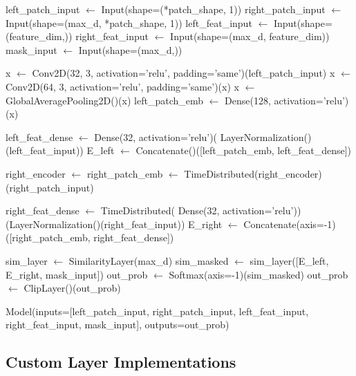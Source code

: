 \documentclass[12pt]{article}
\begin{document}
\begin{algorithm}[H]
\caption{Stereo Matching Model Construction}
\begin{algorithmic}[1]
\State {}
\State left\_patch\_input $\gets$ Input(shape=(*patch\_shape, 1))
\State right\_patch\_input $\gets$ Input(shape=(max\_d, *patch\_shape, 1))
\State left\_feat\_input $\gets$ Input(shape=(feature\_dim,))
\State right\_feat\_input $\gets$ Input(shape=(max\_d, feature\_dim))
\State mask\_input $\gets$ Input(shape=(max\_d,))

\State {}
\State x $\gets$ Conv2D(32, 3, activation='relu', padding='same')(left\_patch\_input)
\State x $\gets$ Conv2D(64, 3, activation='relu', padding='same')(x)
\State x $\gets$ GlobalAveragePooling2D()(x)
\State left\_patch\_emb $\gets$ Dense(128, activation='relu')(x)

\State {}
\State left\_feat\_dense $\gets$ Dense(32, activation='relu')(
    \State \quad LayerNormalization()(left\_feat\_input))
\State E\_left $\gets$ Concatenate()([left\_patch\_emb, left\_feat\_dense])

\State {}
\State right\_encoder $\gets$ 
\State right\_patch\_emb $\gets$ TimeDistributed(right\_encoder)(right\_patch\_input)

\State {}
\State right\_feat\_dense $\gets$ TimeDistributed(
    \State \quad Dense(32, activation='relu'))(LayerNormalization()(right\_feat\_input))
\State E\_right $\gets$ Concatenate(axis=-1)([right\_patch\_emb, right\_feat\_dense])

\State {}
\State sim\_layer $\gets$ SimilarityLayer(max\_d)
\State sim\_masked $\gets$ sim\_layer([E\_left, E\_right, mask\_input])
\State out\_prob $\gets$ Softmax(axis=-1)(sim\_masked)
\State out\_prob $\gets$ ClipLayer()(out\_prob) 

\State \Return Model(inputs=[left\_patch\_input, right\_patch\_input, 
    \State \quad left\_feat\_input, right\_feat\_input, mask\_input], outputs=out\_prob)
\EndFunction
\end{algorithmic}
\end{algorithm}

\subsection{Custom Layer Implementations}
\end{document}
